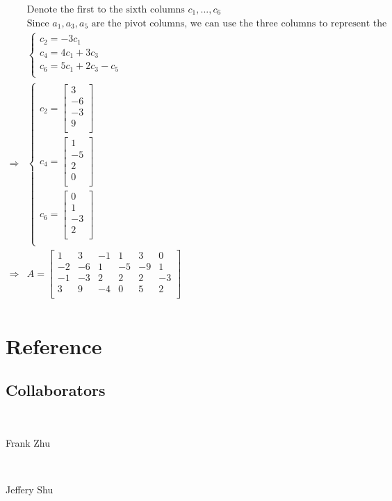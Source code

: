 \documentclass{article}
\begin{document}
\begin{equation*}
\begin{split}
&\text{Denote the first to the sixth columns } c_1,...,c_6\\
&\text{Since }a_1,a_3,a_5\text{ are the pivot columns, we can use the three columns to represent the others.}\\
&\begin{cases}
c_2=-3c_1\\
c_4=4c_1+3c_3\\
c_6=5c_1+2c_3-c_5\\
\end{cases}\\
\Rightarrow&\begin{cases}
c_2=\begin{bmatrix}
3\\
-6\\
-3\\
9\\
\end{bmatrix}\\
c_4=\begin{bmatrix}
1\\
-5\\
2\\
0\\
\end{bmatrix}\\
c_6=\begin{bmatrix}
0\\
1\\
-3\\
2\\
\end{bmatrix}\\
\end{cases}\\
\Rightarrow&A=\begin{bmatrix}
1&3&-1&1&3&0\\
-2&-6&1&-5&-9&1\\
-1&-3&2&2&2&-3\\
3&9&-4&0&5&2\\
\end{bmatrix}\\
\end{split}
\end{equation*}

\newpage

\section{Reference}

\subsection{Collaborators}

~

Frank Zhu

~

Jeffery Shu
\end{document}
